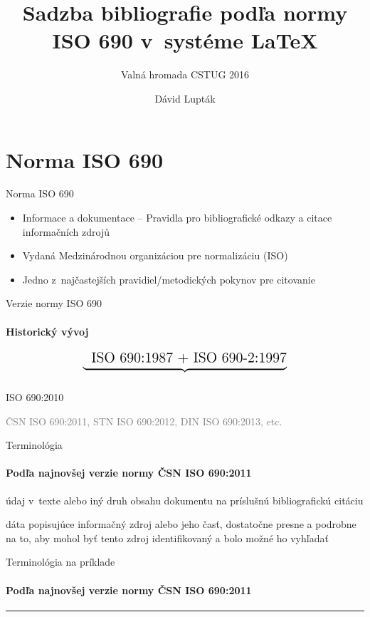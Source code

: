 \documentclass{beamer}
\author{Dávid Lupták}
\title{Sadzba bibliografie podľa normy ISO 690 v~systéme LaTeX}
\subtitle{Valná hromada CSTUG 2016}
\begin{document}
\frame{\titlepage}
\frame{\tableofcontents}

\section{Norma ISO 690}

\begin{frame}{Norma ISO 690}
\begin{itemize}
\item Informace a dokumentace -- Pravidla pro bibliografické odkazy a citace informačních zdrojů
\item Vydaná Medzinárodnou organizáciou pre normalizáciu (ISO)
\item Jedno z~najčastejších pravidiel/metodických pokynov pre citovanie
\end{itemize}
\end{frame}

\begin{frame}{Verzie normy ISO 690}
\framesubtitle{Historický vývoj}
\[
\underbrace{\phantom{\text{-2}}\strut\text{\Large{ISO 690:1987 + ISO 690-2:1997}}}_\text{}
\]
\begin{center}
\LARGE{ISO 690:2010}
\end{center}
\begin{center}
\textcolor{Gray}{ČSN ISO 690:2011, STN ISO 690:2012, DIN ISO 690:2013, etc.}
\end{center}
\end{frame}

\begin{frame}{Terminológia}
\framesubtitle{Podľa najnovšej verzie normy ČSN ISO 690:2011}
\begin{description}[citácia]
\item[odkaz] údaj v~texte alebo iný druh obsahu dokumentu na príslušnú bibliografickú citáciu
\item[citácia] dáta popisujúce informačný zdroj alebo jeho časť, dostatočne presne a podrobne na to, aby mohol byť tento zdroj identifikovaný a bolo možné ho vyhľadať
\end{description}
\end{frame}

\begin{refsection} %
\begin{frame}{Terminológia na príklade}
\framesubtitle{Podľa najnovšej verzie normy ČSN ISO 690:2011}
\rule{\textwidth}{0.2pt}
\printbibliography
\end{frame}
\end{refsection}
\end{document}
